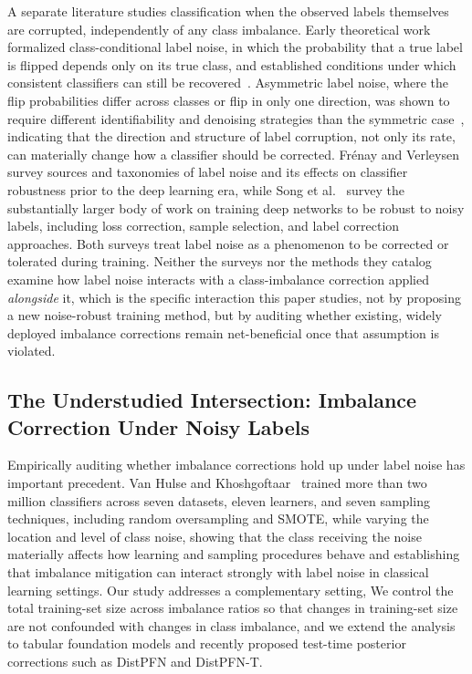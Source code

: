 A separate literature studies classification when the observed labels
themselves are corrupted, independently of any class imbalance. Early
theoretical work formalized class-conditional label noise, in which the
probability that a true label is flipped depends only on its true class, and
established conditions under which consistent classifiers can still be
recovered~\cite{natarajan2013noisylabels}. Asymmetric label noise, where the
flip probabilities differ across classes or flip in only one direction, was
shown to require different identifiability and denoising strategies than the
symmetric case~\cite{scott2013asymmetricnoise}, indicating that the direction
and structure of label corruption, not only its rate, can materially change
how a classifier should be corrected. Frénay and
Verleysen~\cite{frenay2014labelnoise} survey sources and taxonomies of label
noise and its effects on classifier robustness prior to the deep learning era,
while Song et al.~\cite{song2022noisylabelssurvey} survey the substantially
larger body of work on training deep networks to be robust to noisy labels,
including loss correction, sample selection, and label correction approaches.
Both surveys treat label noise as a phenomenon to be corrected or tolerated
during training. Neither the surveys nor the methods they catalog examine how
label noise interacts with a class-imbalance correction applied
\emph{alongside} it, which is the specific interaction this paper studies,
not by proposing a new noise-robust training method, but by auditing whether
existing, widely deployed imbalance corrections remain net-beneficial once
that assumption is violated.

\subsection{The Understudied Intersection: Imbalance Correction Under Noisy Labels}

Empirically auditing whether imbalance corrections hold up under label
noise has important precedent. Van Hulse and
Khoshgoftaar~\cite{vanhulse2009knowledge} trained more than two million
classifiers across seven datasets, eleven learners, and seven sampling
techniques, including random oversampling and SMOTE, while varying the
location and level of class noise, showing that the class receiving the
noise materially affects how learning and sampling procedures behave and
establishing that imbalance mitigation can interact strongly with label
noise in classical learning settings. Our study addresses a
complementary setting, We control the total training-set size across
imbalance ratios so that changes in training-set size are not confounded
with changes in class imbalance, and we extend the analysis to tabular
foundation models and recently proposed test-time posterior corrections
such as DistPFN and DistPFN-T.

